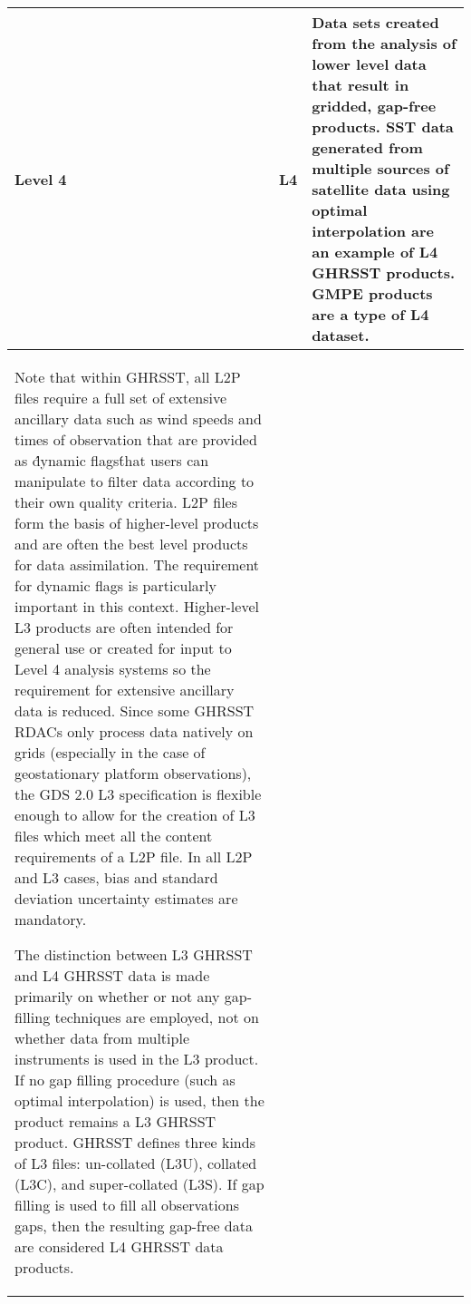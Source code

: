 \begin{table}[h]
\begin{tabular}{|p{}|p{}|p{}|}
Level 4 & L4 &
Data sets created from the analysis of lower level data that result in
gridded, gap-free products. SST data generated from multiple sources
of satellite data using optimal interpolation are an example of L4
GHRSST products. GMPE products are a type of L4 dataset. \\  \hline

Note that within GHRSST, all L2P files require a full set of extensive ancillary data such as wind
speeds and times of observation that are provided as \'dynamic flags\' that users can manipulate to
filter data according to their own quality criteria. L2P files form the basis of higher-level products and
are often the best level products for data assimilation. The requirement for dynamic flags is particularly
important in this context. Higher-level L3 products are often intended for general use or created for
input to Level 4 analysis systems so the requirement for extensive ancillary data is reduced. Since
some GHRSST RDACs only process data natively on grids (especially in the case of geostationary
platform observations), the GDS 2.0 L3 specification is flexible enough to allow for the creation of L3
files which meet all the content requirements of a L2P file. In all L2P and L3 cases, bias and standard
deviation uncertainty estimates are mandatory. \par

The distinction between L3 GHRSST and L4 GHRSST data is made primarily on whether or not any
gap-filling techniques are employed, not on whether data from multiple instruments is used in the L3
product. If no gap filling procedure (such as optimal interpolation) is used, then the product remains a
L3 GHRSST product. GHRSST defines three kinds of L3 files: un-collated (L3U), collated (L3C), and
super-collated (L3S). If gap filling is used to fill all observations gaps, then the resulting gap-free data
are considered L4 GHRSST data products. \par
\end{tabular}
\end{table}





